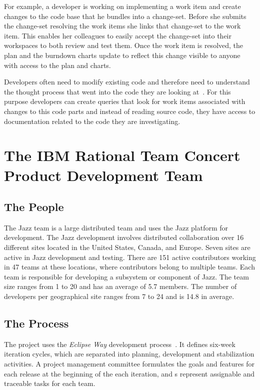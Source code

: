 For example, a developer is working on implementing a work item and create changes to the code base that he bundles into a change-set.
Before she submits the change-set resolving the work items she links that change-set to the work item.
This enables her colleagues to easily accept the change-set into their  workspaces to both review and test them.
Once the work item is resolved, the plan and the burndown charts update to reflect this change visible to anyone with access to the plan and charts.

Developers often need to modify existing code and therefore need to understand the thought process that went into the code they are looking at~\cite{}.
For this purpose developers can create queries that look for work items associated with changes to this code parts and instead of reading source code, they have access to documentation related to the code they are investigating.


\section{The IBM Rational Team Concert Product Development Team}
\subsection{The People}
The Jazz team is a large distributed team and uses the Jazz platform for
development. The Jazz development involves distributed collaboration over 16
different sites located in the United States, Canada, and Europe. Seven sites are
active in Jazz development and testing. There are 151 active contributors
working in 47 teams at these locations, where contributors belong to multiple
teams. Each team is responsible for developing a subsystem or component of Jazz.
The team size ranges from 1 to 20 and has an average of 5.7 members. The number
of developers per geographical site ranges from 7 to 24 and is 14.8 in average.

\subsection{The Process}
The project uses the \emph{Eclipse Way} development process~\cite{frost:ieeesoftware:2007}.
It defines six-week iteration cycles, which are separated into planning,
development and stabilization activities. A project management committee
formulates the goals and features for each release at the beginning of the each
iteration, and s represent assignable and traceable tasks for each
team.

